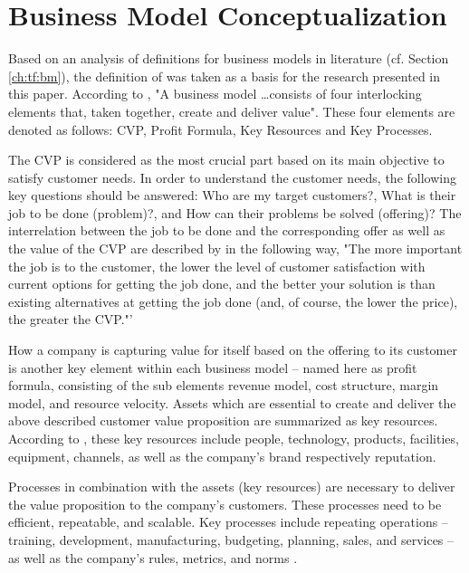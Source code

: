 \section{Business Model Conceptualization}\label{ch:sota:bmc}

Based on an analysis of definitions for business models in literature (cf. Section \ref{ch:tf:bm}), the definition of \citet{Johnson2008} was taken as a basis for the research presented in this paper. According to \citet[p. 52]{Johnson2008}, "A business model \ldots consists of four interlocking elements that, taken together, create and deliver value". These four elements are denoted as follows: \ac{CVP}, Profit Formula, Key Resources and Key Processes. 

The \ac{CVP} is considered as the most crucial part based on its main objective to satisfy customer needs. In order to understand the customer needs, the following key questions should be answered: Who are my target customers?, What is their job to be done (problem)?, and How can their problems be solved (offering)? The interrelation between the job to be done and the corresponding offer as well as the value of the \ac{CVP} are described by  \citet[p. 52]{Johnson2008} in the following way, "The more important the job is to the customer, the lower the level of customer satisfaction with current options for getting the job done, and the better your solution is than existing alternatives at getting the job done (and, of course, the lower the price), the greater the CVP."'

How a company is capturing value for itself based on the offering to its customer is another key element within each business model -- named here as profit formula, consisting of the sub elements revenue model, cost structure, margin model, and resource velocity. 
Assets which are essential to create and deliver the above described customer value proposition are summarized as key resources. According to \citet[p. 53]{Johnson2008}, these key resources include people, technology, products, facilities, equipment, channels, as well as the company's brand respectively reputation.

Processes in combination with the assets (key resources) are necessary to deliver the value proposition to the company's customers. These processes need to be efficient, repeatable, and scalable. Key processes include repeating operations -- training, development, manufacturing, budgeting, planning, sales, and services -- as well as the company's rules, metrics, and norms \citep[p. 53]{Johnson2008}.


